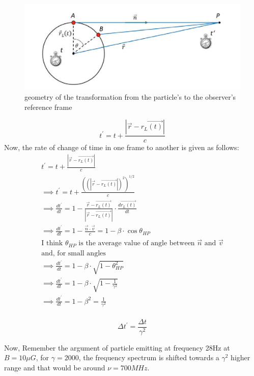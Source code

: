 \documentclass[12pt]{report}
\newcommand{\de}[2]{\frac{d{#1}}{d{#2}}}
\newcommand{\cbox}{tcolorbox}
\newcommand{\cc}[1]{\left({#1}\right)}
\newcommand{\tx}[1]{\text{#1}}
\begin{document}
\begin{figure}[h!]\label{figtrans}
\includegraphics[width=\linewidth]{figtrans.png}
\caption{geometry of the transformation from the particle's to the observer's reference frame}
\end{figure}
\begin{equation}
t^\prime=t+\frac{|\vec{r}-\vec{r_L(t)}|}{c}
\end{equation}
Now, the rate of change of time in one frame to another is given as follows:
\begin{eqnarray*}
t^\prime=t+\frac{|\vec{r}-\vec{r_L(t)}|}{c}\\
\implies t^\prime=t+\frac{\cc{\cc{|\vec{r}-\vec{r_L(t)}|}^2}^{1/2}}{c}\\
\implies \de{t^\prime}{t}=1-\frac{\vec{r}-\vec{r_L(t)}}{|\vec{r}-\vec{r_L(t)}|}\cdot \de{\vec{r_L(t)}}{t}\\
\implies \de{t^\prime}{t}=1-\frac{\vec{n}\cdot \vec{v}}{c}=1-\beta \cdot \cos \theta_{HP}\\
\tx{I think $\theta_{HP}$ is the average value of angle between $\vec{n}$ and $\vec{v}$}\\
\tx{and, for small angles}\\
\implies \de{t^\prime}{t}=1-\beta \cdot \sqrt{1- \theta^2_{HP}} \\
\implies \de{t^\prime}{t}=1-\beta \cdot \sqrt{1- \frac{1}{\gamma^2}} \\
\implies \de{t^\prime}{t}=1-\beta^2 =\frac{1}{\gamma^2} \\
\end{eqnarray*}
\begin{\cbox}
\begin{equation}
\Delta t^\prime =\frac{\Delta t }{\gamma^2}
\end{equation}

\end{\cbox}
Now, Remember the argument of particle emitting at frequency 28Hz at $B=10\mu G$, for $\gamma=2000$, the frequency spectrum is shifted towards a $\gamma^2$ higher range and that would be around $\nu=700MHz$.\\
\end{document}

